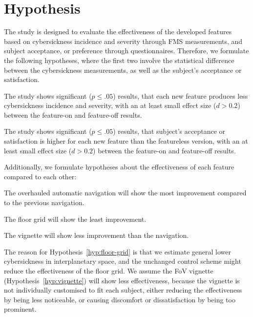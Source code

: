\section{Hypothesis}\label{sec:hypothesis}

The study is designed to evaluate the effectiveness of the developed features based on cybersickness incidence and
severity through FMS measurements, and subject acceptance, or preference through questionnaires.
Therefore, we formulate the following hypotheses, where the first two involve the statistical difference between
the cybersickness measurements, as well as the subject's acceptance or satisfaction.
\begin{hypothesis}
    \label{hyp:cybersickness}
    The study shows significant ($p \leq .05$) results, that each new feature produces less cybersickness incidence
    and
    severity, with an at least small effect size ($d > 0.2$) between the feature-on and feature-off results.
\end{hypothesis}
\begin{hypothesis}
    \label{hyp:satisfaction}
    The study shows significant ($p \leq .05$) results, that subject's acceptance or satisfaction is higher for each new
    feature than the featureless version, with an at least small effect size ($d > 0.2$) between the feature-on and
    feature-off results.
\end{hypothesis}

Additionally, we formulate hypotheses about the effectiveness of each feature compared to each other:
\begin{hypothesis}
    \label{hyp:navigation}
    The overhauled automatic navigation will show the most improvement compared to the previous navigation.
\end{hypothesis}
\begin{hypothesis}
    \label{hyp:floor-grid}
    The floor grid will show the least improvement.
\end{hypothesis}
\begin{hypothesis}
    \label{hyp:vignette}
    The vignette will show less improvement than the navigation.
\end{hypothesis}
The reason for Hypothesis~\ref{hyp:floor-grid} is that we estimate general lower cybersickness in interplanetary
space, and the unchanged control scheme might reduce the effectiveness of the floor grid.
We assume the FoV vignette (Hypothesis~\ref{hyp:vignette}) will show less effectiveness, because the vignette is not
individually customised to fit each subject, either reducing the effectiveness by being less noticeable, or causing
discomfort or dissatisfaction by being too prominent.

